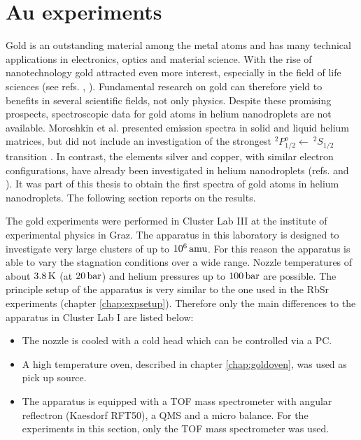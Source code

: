 \documentclass[parskip,12pt,headsepline,a4paper] {scrbook}
\begin{document}
\newpage

\section{Au experiments}
\vspace{-1\baselineskip}
\label{chap:auex}
Gold is an outstanding material among the metal atoms and has many technical applications in electronics, optics and material science. With the rise of nanotechnology gold attracted even more interest, especially in the field of life sciences (see refs. \cite{biogold1}, \cite{biogold2}). Fundamental research on gold can therefore yield to benefits in several scientific fields, not only physics. Despite these promising prospects, spectroscopic data for gold atoms in helium nanodroplets are not available. Moroshkin et al. presented emission spectra in solid and liquid helium matrices, but did not include an investigation of the strongest $^2P^o_{1/2} \leftarrow \ ^2S_{1/2}$ transition \cite{moroshkin}. In contrast, the elements silver and copper, with similar electron configurations, have already been investigated in helium nanodroplets (refs. \cite{loginov2007excited} and \cite{cufritz}).
It was part of this thesis to obtain the first spectra of gold atoms in helium nanodroplets. The following section reports on the results.

The gold experiments were performed in Cluster Lab III at the institute of experimental physics in Graz. The apparatus in this laboratory is designed to investigate very large clusters of up to $\unit[10^6]{amu}$. For this reason the apparatus is able to vary the stagnation conditions over a wide range. Nozzle temperatures of about $\unit[3.8]{K}$ (at $\unit[20]{bar}$) and helium pressures up to $\unit[100]{bar}$ are possible. The principle setup of the apparatus is very similar to the one used in the RbSr experiments (chapter \ref{chap:expsetup}). Therefore only the main differences to the apparatus in Cluster Lab I are listed below:

\begin{itemize}
\item The nozzle is cooled with a cold head which can be controlled via a PC.
\item A high temperature oven, described in chapter \ref{chap:goldoven}, was used as pick up source.
\item The apparatus is equipped with a TOF mass spectrometer with angular reflectron (Kaesdorf RFT50), a QMS and a micro balance. For the experiments in this section, only the TOF mass spectrometer was used.
\end{itemize}
\end{document}
